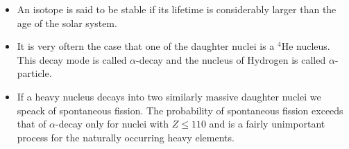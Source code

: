\documentclass[10pt,a4paper]{article}
\begin{document}
\begin{itemize}
    \item An isotope is said to be stable if its lifetime is considerably larger than the age of the solar system.
    \item It is very oftern the case that one of the daughter nuclei is a $^4\text{He}$ nucleus. This decay mode is called $\alpha$-decay and the nucleus of Hydrogen is called $\alpha$-particle.
    \item If a heavy nucleus decays into two similarly massive daughter nuclei we speack of spontaneous fission. The probability of spontaneous fission exceeds that of $\alpha$-decay only for nuclei with $Z\leq 110$  and is a fairly unimportant process for the naturally occurring heavy elements.
\end{itemize}
\end{document}

